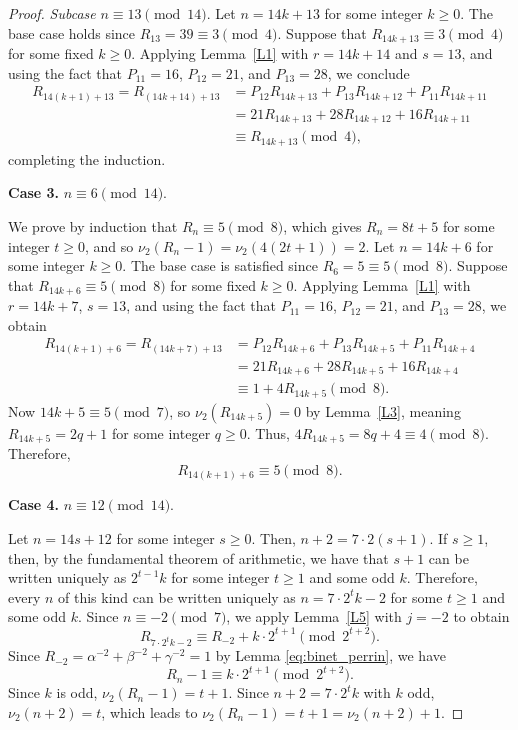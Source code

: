 \documentclass[11pt,a4paper]{article}
\numberwithin{equation}{section}
\numberwithin{table}{section}
\numberwithin{figure}{section}
\begin{document}
\begin{proof}
	\smallskip
	\textit{Subcase} $n\equiv 13\pmod{14}$. Let $n=14k+13$ for some integer $k\ge 0$. 
	The base case holds since $R_{13}=39\equiv 3\pmod{4}$. 
	Suppose that $R_{14k+13}\equiv 3\pmod{4}$ for some fixed $k\ge 0$. 
	Applying Lemma~\ref{L1} with $r=14k+14$ and $s=13$, 
	and using the fact that $P_{11}=16$, $P_{12}=21$, and $P_{13}=28$, 
	we conclude
	\begin{align*}
		R_{14(k+1)+13} = R_{(14k+14)+13}&= P_{12}R_{14k+13}+P_{13}R_{14k+12}+P_{11}R_{14k+11}\\
		&= 21R_{14k+13}+28R_{14k+12}+16R_{14k+11}\\
		&\equiv R_{14k+13}\pmod{4},
	\end{align*}
	completing the induction.
	
	\medskip
	\noindent\textbf{Case 3.} $n\equiv 6\pmod{14}$.
	
	We prove by induction that $R_n\equiv 5\pmod{8}$, which gives $R_{n}=8t+5$ for some integer $t\ge 0$, and so 
	$\nu_2(R_n-1)=\nu_2(4(2t+1))=2$. Let $n=14k+6$ for some integer $k\ge 0$. 
	The base case is satisfied since $R_6=5\equiv 5\pmod{8}$. Suppose that $R_{14k+6}\equiv 5\pmod{8}$ for some fixed $k\ge 0$. Applying 
	Lemma~\ref{L1} with $r=14k+7$, $s=13$, and using the fact that $P_{11}=16$, 
	$P_{12}=21$, and $P_{13}=28$, we obtain
	\begin{align*}
		R_{14(k+1)+6} = R_{(14k+7)+13}
		&= P_{12}R_{14k+6}+P_{13}R_{14k+5}
		+P_{11}R_{14k+4}\\
		&= 21R_{14k+6}+28R_{14k+5}+16R_{14k+4}\\
		&\equiv 1+4R_{14k+5}\pmod{8}.
	\end{align*}
    Now $14k+5\equiv 5\pmod{7}$, so 
	$\nu_2(R_{14k+5})=0$ by Lemma~\ref{L3}, meaning 
	$R_{14k+5}=2q+1$ for some integer $q\ge 0$. Thus,
	$4R_{14k+5}=8q+4\equiv 4\pmod{8}$.
	Therefore,
	$$
	R_{14(k+1)+6}\equiv 5\pmod{8}.
	$$
	
	\medskip
	\noindent\textbf{Case 4.} $n\equiv 12\pmod{14}$.
	
	Let $n=14s+12$ for some integer $s\ge 0$. Then, $n+2=7\cdot 2(s+1)$. If $s\ge 1$, then, by the fundamental theorem of arithmetic, we have that $s+1$ can be written uniquely as $2^{t-1}k$ for some integer $t\ge 1$ and some odd $k$. Therefore, every $n$ of this kind 
	can be written uniquely as $n=7\cdot 2^t k-2$ for some $t\ge 1$ and some odd $k$.
	Since $n\equiv -2\pmod{7}$, we apply 
	Lemma~\ref{L5} with $j=-2$ to obtain
	\begin{equation*}
		R_{7\cdot 2^t k-2}\equiv R_{-2}+k\cdot 2^{t+1}
		\pmod{2^{t+2}}.
	\end{equation*}
	Since $R_{-2}=\alpha^{-2}+\beta^{-2}+\gamma^{-2}=1$ by Lemma \ref{eq:binet_perrin}, we have
	\begin{equation*}
		R_n-1\equiv k\cdot 2^{t+1}\pmod{2^{t+2}}.
	\end{equation*}
	Since $k$ is odd, $\nu_2(R_n-1)=t+1$. Since 
	$n+2=7\cdot 2^t k$ with $k$ odd, $\nu_2(n+2)=t$, 
	which leads to $\nu_2(R_n-1)=t+1=\nu_2(n+2)+1$.
	

\end{proof}
\end{document}
